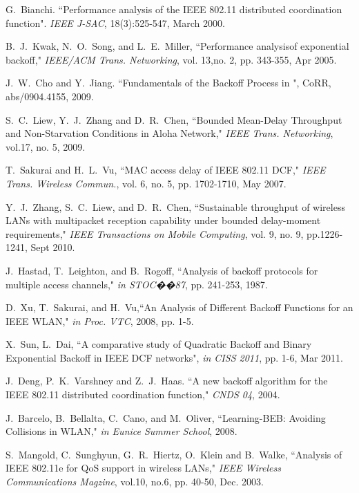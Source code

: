 \documentclass[journal]{IEEEtran}
\begin{document}
\begin{thebibliography}{1}
G.~Bianchi. ``Performance analysis of the IEEE 802.11 distributed coordination function". \emph{IEEE J-SAC}, 18(3):525-547, March 2000.

B.~J.~Kwak, N.~O.~Song, and L.~E.~Miller, ``Performance analysisof exponential backoff,"  \emph{IEEE/ACM Trans. Networking}, vol. 13,no. 2, pp. 343-355, Apr 2005.

J.~W.~Cho and Y.~Jiang. ``Fundamentals of the Backoff Process in ", CoRR, abs/0904.4155, 2009.

S.~C.~Liew, Y.~J.~Zhang and D.~R.~Chen, ``Bounded Mean-Delay Throughput and Non-Starvation Conditions in Aloha Network," \emph{IEEE Trans. Networking}, vol.17, no. 5, 2009.

T.~Sakurai and H.~L.~Vu, ``MAC access delay of IEEE 802.11 DCF,"  \emph{IEEE Trans. Wireless Commun.}, vol. 6, no. 5, pp. 1702-1710, May 2007.

Y.~J.~Zhang, S.~C.~Liew, and D.~R.~Chen, ``Sustainable throughput of wireless LANs with multipacket reception capability under bounded delay-moment requirements," \emph{IEEE Transactions on Mobile Computing}, vol. 9, no. 9, pp.1226-1241, Sept 2010.

J.~Hastad, T.~Leighton, and B.~Rogoff, ``Analysis of backoff protocols for multiple access channels," \emph{in STOC��87}, pp. 241-253, 1987.

D.~Xu, T.~Sakurai, and H.~Vu,``An Analysis of Different Backoff Functions for an IEEE  WLAN," \emph{in Proc. VTC}, 2008, pp. 1-5.

X.~Sun, L.~Dai, ``A comparative study of Quadratic Backoff and Binary Exponential Backoff in IEEE  DCF networks", \emph{in CISS 2011}, pp. 1-6, Mar 2011.

J.~Deng, P.~K.~Varshney and Z.~J.~Haas. ``A new backoff algorithm for the IEEE 802.11 distributed coordination function," \emph{CNDS 04}, 2004.

J.~Barcelo, B.~Bellalta, C.~Cano, and M.~Oliver, ``Learning-BEB: Avoiding Collisions in WLAN," \emph{in Eunice Summer School}, 2008.

S.~Mangold, C.~Sunghyun, G.~R.~Hiertz, O.~Klein and B.~Walke, ``Analysis of IEEE 802.11e for QoS support in wireless LANs," \emph{IEEE Wireless Communications Magzine}, vol.10, no.6, pp. 40-50, Dec. 2003.


\end{thebibliography}
\end{document}
